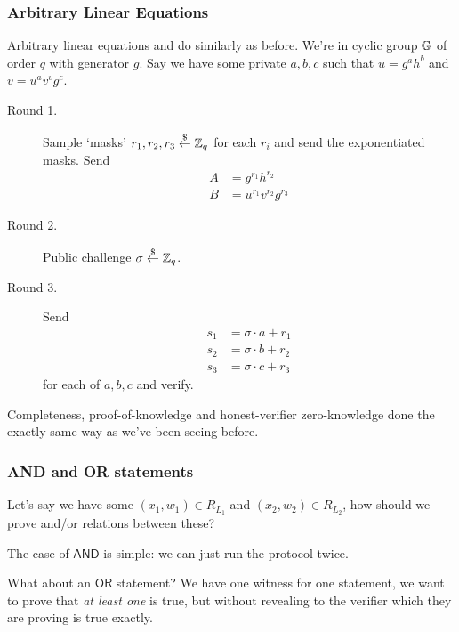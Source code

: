 \subsubsection{Arbitrary Linear Equations}
\begin{example}
    Arbitrary linear equations and do similarly as before. We're in cyclic group $\mathbb G$ of order $q$ with generator $g$. Say we have some private $a, b, c$ such that $u = g^{a}h^{b}$ and $v = u^av^vg^c$.
    \begin{description}
        \item[Round 1.] Sample `masks' $r_1, r_2, r_3\overset{\$}{\leftarrow}\mathbb Z_q$ for each $r_i$ and send the exponentiated masks. Send
            \begin{align*}
                A & = g^{r_1}h^{r_2}        \\
                B & = u^{r_1}v^{r_2}g^{r_3}
            \end{align*}
        \item[Round 2.] Public challenge $\sigma\overset{\$}{\leftarrow}\mathbb Z_q$.
        \item[Round 3.] Send
            \begin{align*}
                s_1 & = \sigma\cdot a + r_1 \\
                s_2 & = \sigma\cdot b + r_2 \\
                s_3 & = \sigma\cdot c + r_3
            \end{align*} for each of $a, b, c$ and verify.
    \end{description}

    Completeness, proof-of-knowledge and honest-verifier zero-knowledge done the exactly same way as we've been seeing before.
\end{example}

\subsubsection{\textsf{AND} and \textsf{OR} statements}
Let's say we have some $(x_1, w_1)\in R_{L_1}$ and $(x_2, w_2)\in R_{L_2}$, how should we prove and/or relations between these?

The case of $\mathsf{AND}$ is simple: we can just run the protocol twice.

What about an $\mathsf{OR}$ statement? We have one witness for one statement, we want to prove that \emph{at least one} is true, but without revealing to the verifier which they are proving is true exactly.

